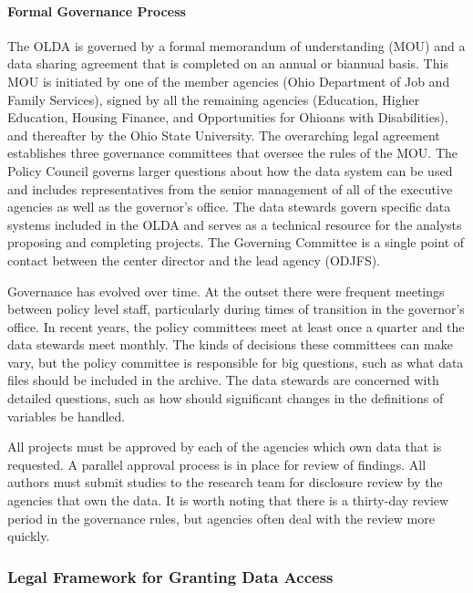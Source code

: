 \documentclass[
]{WileySix}
\begin{document}
\hypertarget{formal-governance-process}{%
\paragraph{Formal Governance Process}\label{formal-governance-process}}

The OLDA is governed by a formal memorandum of understanding (MOU) and a data sharing agreement that is completed on an annual or biannual basis. This MOU is initiated by one of the member agencies (Ohio Department of Job and Family Services), signed by all the remaining agencies (Education, Higher Education, Housing Finance, and Opportunities for Ohioans with Disabilities), and thereafter by the Ohio State University. The overarching legal agreement establishes three governance committees that oversee the rules of the MOU. The Policy Council governs larger questions about how the data system can be used and includes representatives from the senior management of all of the executive agencies as well as the governor's office. The data stewards govern specific data systems included in the OLDA and serves as a technical resource for the analysts proposing and completing projects. The Governing Committee is a single point of contact between the center director and the lead agency (ODJFS).

Governance has evolved over time. At the outset there were frequent meetings between policy level staff, particularly during times of transition in the governor's office. In recent years, the policy committees meet at least once a quarter and the data stewards meet monthly. The kinds of decisions these committees can make vary, but the policy committee is responsible for big questions, such as what data files should be included in the archive. The data stewards are concerned with detailed questions, such as how should significant changes in the definitions of variables be handled.

All projects must be approved by each of the agencies which own data that is requested. A parallel approval process is in place for review of findings. All authors must submit studies to the research team for disclosure review by the agencies that own the data. It is worth noting that there is a thirty-day review period in the governance rules, but agencies often deal with the review more quickly.

\hypertarget{legal-framework-for-granting-data-access-1}{%
\subsubsection{Legal Framework for Granting Data Access}\label{legal-framework-for-granting-data-access-1}}
\end{document}
